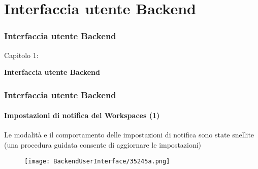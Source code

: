 %

\section{Interfaccia utente Backend}
\begin{frame}[fragile]
	\frametitle{Interfaccia utente Backend}

	\begin{center}\huge{Capitolo 1:}\end{center}
	\begin{center}\huge{\color{typo3darkgrey}\textbf{Interfaccia utente Backend}}\end{center}

\end{frame}

\begin{frame}[fragile]
	\frametitle{Interfaccia utente Backend}
	\framesubtitle{Impostazioni di notifica del Workspaces (1)}

	Le modalità e il comportamento delle impostazioni di notifica sono state snellite\newline
	\smaller(una procedura guidata consente di aggiornare le impostazioni)\normalsize

	\begin{figure}
		\texttt{[image: BackendUserInterface/35245a.png]}
	\end{figure}

\end{frame}

